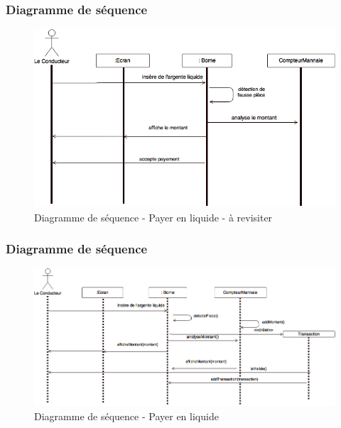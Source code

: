 \subsubsection{Diagramme de séquence}
\begin{figure}[!htb]
    \centering
    \includegraphics[scale=0.5]{02_Desenvolvimento/TD2/images/DSPayerLiquide.png}
    \caption{Diagramme de séquence - Payer en liquide - à revisiter }
\end{figure}
\subsubsection{Diagramme de séquence}
\begin{figure}[!htb]
    \centering
    \includegraphics[scale=0.5]{02_Desenvolvimento/TD2/images/v2-DSPayerLiquide.png}
    \caption{Diagramme de séquence - Payer en liquide}
\end{figure}